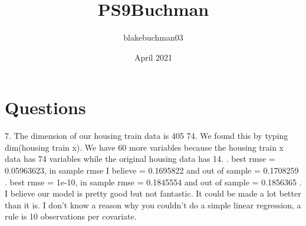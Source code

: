 \documentclass{article}
\title{PS9Buchman}
\author{blakebuchman03 }
\date{April 2021}
\begin{document}
\maketitle

\section{Questions}
7. The dimension of our housing train data is 405 74. We found this by typing dim(housing train x). We have 60 more variables because the housing train x data has 74 variables while the original housing data has 14. 
. best rmse = 0.05963623, in sample rmse I believe = 0.1695822
and out of sample = 0.1708259
. best rmse = 1e-10, in sample rmse = 0.1845554 and out of sample = 0.1856365
. I believe our model is pretty good but not fantastic. It could be made a lot better than it is. I don't know a reason why you couldn't do a simple linear regression, a rule is 10 observations per covariate. 
\end{document}
